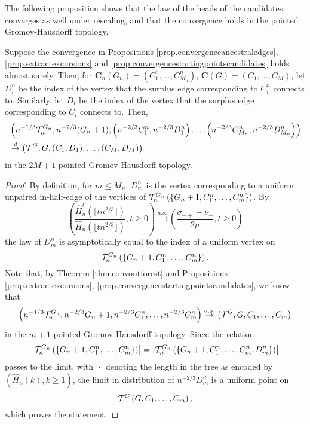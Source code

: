 The following proposition shows that the law of the heads of the candidates converges as well under rescaling, and that the convergence holds in the pointed Gromov-Hausdorff topology. 
\begin{proposition}\label{prop.convergenceheadscandidates}
Suppose the convergence in Propositions \ref{prop.convergenceancestraledges}, \ref{prop.extractexcursions} and \ref{prop.convergencestartingpointscandidates} holds almost surely. Then, for $\mathbf{C}_n(G_n)=(C^n_1,\dots, C^n_{M_n})$, $\mathbf{C}(G)=(C_1,\dots, C_{M})$, let $D^n_i$ be the index of the vertex that the surplus edge corresponding to $C^n_i$ connects to. Similarly, let $D_i$ be the index of the vertex that the surplus edge corresponding to $C_i$ connects to. Then, 
\begin{align*}&\left(n^{-1/3}\cT_n^{G_n}, n^{-2/3}(G_n+1), \left(n^{-2/3}C^n_1,n^{-2/3}D^n_1\right) \dots, \left(n^{-2/3}C^n_{M_n}, n^{-2/3}D^n_{M_n}\right)\right)\\
&\overset{d}{\to}\left(\cT^{G}, G, (C_1,D_1),\dots, (C_{M},D_{M})\right)\end{align*}
in the $2M+1$-pointed Gromov-Hausdorff topology. 
\end{proposition}
\begin{proof}
By definition, for $m\leq M_n$, $D^n_m$ is the vertex corresponding to a uniform unpaired in-half-edge of the vertices of ${\mathcal T}^{G_n}_n\left(\{G_n+1,C^n_1,\dots,C^n_{m}\}\right)$. By 
$$\left(\frac{\hat{H}_n^\ell\left(\lfloor t n^{2/3}\rfloor \right)}{\hat{H}_n\left(\lfloor t n^{2/3}\rfloor \right)},t\geq 0\right)\overset{a.s.}{\to} \left(\frac{\sigma_{-+}+\nu_-}{2\mu},t\geq 0\right)$$
the law of $D^n_m$ is asymptotically equal to the index of a uniform vertex on $${\mathcal T}^{G_n}_n\left(\{G_n+1,C^n_1,\dots,C^n_{m}\}\right).$$
Note that, by Theorem \ref{thm.convoutforest} and  Propositions \ref{prop.extractexcursions}, \ref{prop.convergencestartingpointscandidates}, we know that
$$\left(n^{-1/3}{\mathcal T}^{G_n}_n,n^{-2/3}G_n+1,n^{-2/3}C^n_1,\dots,n^{-2/3}C^n_{m}\right)\overset{a.s.}{\to}\left({\mathcal T}^G, G,C_1,\dots,C_m\right)$$
in the $m+1$-pointed Gromov-Hausdorff topology. Since the relation $$\left|{\mathcal T}^{G_n}_n\left(\{G_n+1,C^n_1,\dots,C^n_{m}\}\right)\right|=\left|{\mathcal T}^{G_n}_n\left(\{G_n+1,C^n_1,\dots,C^n_{m}, D^n_{m}\}\right)\right|$$ passes to the limit, with $|\cdot|$ denoting the length in the tree as encoded by $(\hat{H}_n(k),k\geq 1)$, the limit in distribution of $n^{-2/3}D^n_m$ is a uniform point on $${\mathcal T}^G\left(G,C_1,\dots,C_m\right),$$
which proves the statement.

\end{proof}
